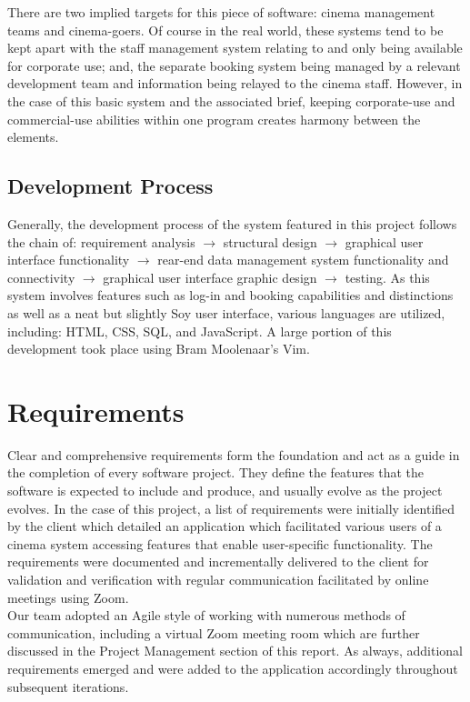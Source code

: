 \documentclass[11pt, english]{article}
\begin{document}
	There are two implied targets for this piece of software: cinema management teams and cinema-goers. Of course in the real world, these systems tend to be kept apart with the staff management system relating to and only being available for corporate use; and, the separate booking system being managed by a relevant development team and information being relayed to the cinema staff. However, in the case of this basic system and the associated brief, keeping corporate-use and commercial-use abilities within one program creates harmony between the elements.

	\subsection{Development Process}

	Generally, the development process of the system featured in this project follows the chain of: requirement analysis $\rightarrow$ structural design $\rightarrow$ graphical user interface functionality $\rightarrow$ rear-end data management system functionality and connectivity $\rightarrow$ graphical user interface graphic design $\rightarrow$ testing. As this system involves features such as log-in and booking capabilities and distinctions as well as a neat but slightly Soy user interface, various languages are utilized, including: HTML, CSS, SQL, and JavaScript. A large portion of this development took place using Bram Moolenaar's Vim.

\newpage

\section{Requirements}

	Clear and comprehensive requirements form the foundation and act as a guide in the completion of every software project. They define the features that the software is expected to include and produce, and usually evolve as the project evolves. In the case of this project, a list of requirements were initially identified by the client which detailed an application which facilitated various users of a cinema system accessing features that enable user-specific functionality. The requirements were documented and incrementally delivered to the client for validation and verification with regular communication facilitated by online meetings using Zoom.\\

	Our team adopted an Agile style of working with numerous methods of communication, including a virtual Zoom meeting room which are further discussed in the Project Management section of this report. As always, additional requirements emerged and were added to the application accordingly throughout subsequent iterations.
\end{document}
